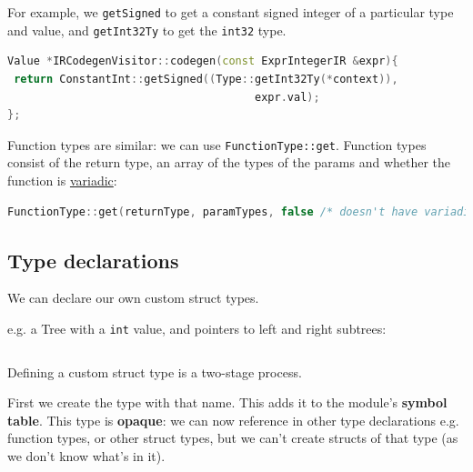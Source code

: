 For example, we \texttt{getSigned} to get a constant signed integer of a
particular type and value, and \texttt{getInt32Ty} to get the
\texttt{int32} type.

%

\begin{lstlisting}[language=C++,caption={expr\_codegen.cc}]
Value *IRCodegenVisitor::codegen(const ExprIntegerIR &expr){
 return ConstantInt::getSigned((Type::getInt32Ty(*context)),
                                      expr.val);
};
\end{lstlisting}

Function types are similar: we can use \texttt{FunctionType::get}.
Function types consist of the return type, an array of the types of the
params and whether the function is
\href{https://en.wikipedia.org/wiki/Variadic_function}{variadic}:

%

\begin{lstlisting}[language=C++,caption={{function\_codegen.cc}}]
FunctionType::get(returnType, paramTypes, false /* doesn't have variadic args */);
\end{lstlisting}

\hypertarget{type-declarations}{%
\subsection{\texorpdfstring{\protect\hyperlink{type-declarations}{}Type
declarations}{Type declarations}}\label{type-declarations}}

We can declare our own custom struct types.

e.g. a Tree with a \texttt{int} value, and pointers to left and right
subtrees:


\begin{lstlisting}[language=llvm]
%Tree = type {i32, Tree*, Tree* }
\end{lstlisting}

Defining a custom struct type is a two-stage process.

First we create the type with that name. This adds it to the module's
\textbf{symbol table}. This type is \textbf{opaque}: we can now
reference in other type declarations e.g. function types, or other
struct types, but we can't create structs of that type (as we don't know
what's in it).

